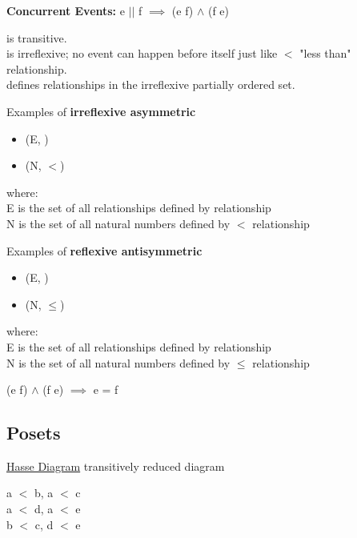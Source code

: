 \documentclass[twoside]{article}
\begin{document}
\textbf{Concurrent Events:} e $||$ f $ \implies $ (e  \cancel{\textrightarrow} f) $\land$ (f \cancel{\textrightarrow} e)

\textrightarrow is transitive. \\
\textrightarrow is irreflexive; no event can happen before itself just like $<$ "less than" relationship. \\
\textrightarrow defines relationships in the irreflexive partially ordered set.

Examples of \textbf{irreflexive asymmetric}
\begin{itemize}
	\item (E, \textrightarrow)
	\item (N, $<$)
\end{itemize}
where: \\
E is the set of all relationships defined by \textrightarrow relationship \\
N is the set of all natural numbers defined by $<$ relationship


Examples of \textbf{reflexive antisymmetric}
\begin{itemize}
	\item (E, \underline{\textrightarrow})
	\item (N, $\leq$)
\end{itemize}
where: \\
E is the set of all relationships defined by \underline{\textrightarrow}relationship \\
N is the set of all natural numbers defined by $\leq$ relationship

(e  \underline{\textrightarrow} f) $\land$ (f  \underline{\textrightarrow} e) $\implies$ e = f


\subsection*{Posets}

\underline {Hasse Diagram} transitively reduced diagram 



a $<$ b, a $<$ c \\
a $<$ d, a $<$ e \\
b $<$ c, d $<$ e \\
 
\end{document}
